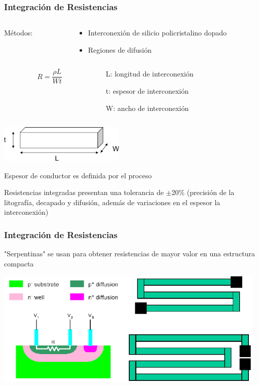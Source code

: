 \documentclass[aspectratio=169,10pt]{beamer}
\begin{document}
\begin{frame}[t]
\frametitle{Integración de Resistencias}
\begin{columns}
\begin{column}{0.2\textwidth}
	Métodos:
\end{column}
\begin{column}{0.8\textwidth}
	\begin{itemize}
		\item Interconexión de silicio policristalino dopado
		\item Regiones de difusión
	\end{itemize}
\end{column}
\end{columns}

\vspace{3mm}
\begin{columns}
	\begin{column}{0.2\textwidth}
		\[ R = \dfrac{\rho L}{Wt} \]
	\end{column}
	\begin{column}{0.8\textwidth}
		L: longitud de interconexión
		
		t: espesor de interconexión
		
		W: ancho de interconexión
	\end{column}
\end{columns}


\vspace{5mm}\centering
\includegraphics[width=6cm]{resist}

\raggedright
\vspace{5mm}
Espesor de conductor es definida por el proceso

\vspace{3mm}
Resistencias integradas presentan una tolerancia de $\pm$20\% (precisión de la litografía, decapado y difusión, además de variaciones en el espesor la interconexión)
\end{frame}


\begin{frame}[t]
\frametitle{Integración de Resistencias}
"Serpentinas" se usan para obtener resistencias de mayor valor en una estructura compacta

\centering\vspace{5mm}
\includegraphics[width=13cm]{resist2}
\end{frame}
\end{document}
